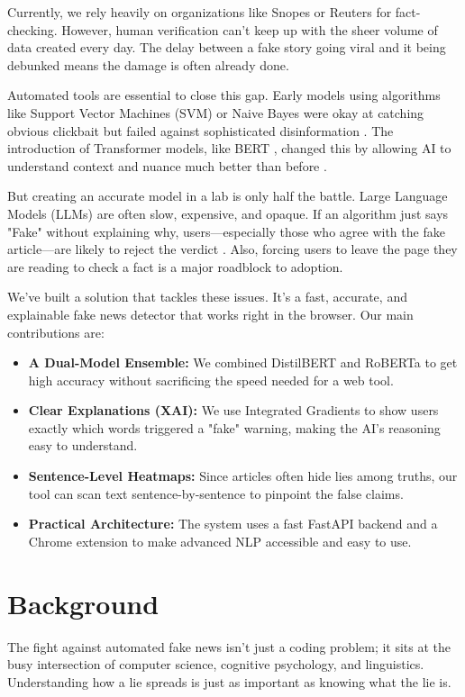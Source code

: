 \documentclass[conference]{IEEEtran}
\begin{document}
Currently, we rely heavily on organizations like Snopes or Reuters for fact-checking. However, human verification can't keep up with the sheer volume of data created every day. The delay between a fake story going viral and it being debunked means the damage is often already done. 

Automated tools are essential to close this gap. Early models using algorithms like Support Vector Machines (SVM) or Naive Bayes were okay at catching obvious clickbait but failed against sophisticated disinformation \cite{b5}. The introduction of Transformer models, like BERT \cite{b2}, changed this by allowing AI to understand context and nuance much better than before \cite{b1}.

But creating an accurate model in a lab is only half the battle. Large Language Models (LLMs) are often slow, expensive, and opaque. If an algorithm just says "Fake" without explaining why, users—especially those who agree with the fake article—are likely to reject the verdict \cite{b14}. Also, forcing users to leave the page they are reading to check a fact is a major roadblock to adoption.

We've built a solution that tackles these issues. It's a fast, accurate, and explainable fake news detector that works right in the browser. Our main contributions are:

\begin{itemize}
\item \textbf{A Dual-Model Ensemble:} We combined DistilBERT and RoBERTa to get high accuracy without sacrificing the speed needed for a web tool.
\item \textbf{Clear Explanations (XAI):} We use Integrated Gradients to show users exactly which words triggered a "fake" warning, making the AI's reasoning easy to understand.
\item \textbf{Sentence-Level Heatmaps:} Since articles often hide lies among truths, our tool can scan text sentence-by-sentence to pinpoint the false claims.
\item \textbf{Practical Architecture:} The system uses a fast FastAPI backend and a Chrome extension to make advanced NLP accessible and easy to use.
\end{itemize}

\section{Background}
The fight against automated fake news isn't just a coding problem; it sits at the busy intersection of computer science, cognitive psychology, and linguistics. Understanding how a lie spreads is just as important as knowing what the lie is.
\end{document}
